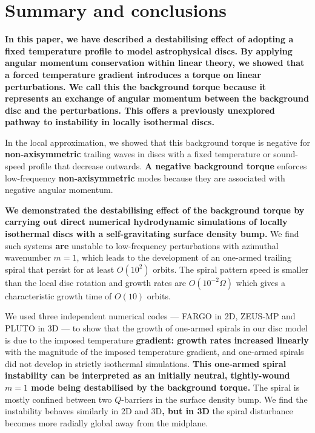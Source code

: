 
\section{Summary and conclusions}\label{summary}
{\bf
  In this paper, we have described a destabilising  
  effect of adopting a fixed temperature profile to model   
  astrophysical discs. By applying angular momentum conservation
  within linear theory, we showed that a forced temperature gradient 
  introduces a torque on linear perturbations. We call this the
  background torque because it represents an exchange of angular
  momentum between the background disc and the perturbations. This 
  offers a previously unexplored pathway to instability in locally
  isothermal discs.  
}

In the local approximation, we showed that this background torque is
negative for {\bf non-axisymmetric} trailing waves in discs with a fixed temperature or
sound-speed profile that decrease outwards. {\bf A negative background torque} enforces  
low-frequency {\bf non-axisymmetric} modes because they are associated
with negative angular momentum.

{\bf 
  We demonstrated the destabilising effect of the background torque by
  carrying out direct numerical hydrodynamic simulations of 
  locally isothermal discs with a self-gravitating surface density
  bump. 
}
We find such systems {\bf are} unstable to low-frequency perturbations
with azimuthal wavenumber $m=1$, which leads to the development of an one-armed 
trailing spiral that persist for at least $O(10^2)$ orbits. The spiral
pattern speed is smaller than the local disc rotation and
growth rates are $O(10^{-2}\Omega)$ which gives a characteristic
growth time of $O(10)$ orbits. 

We used three independent numerical codes --- FARGO in 2D, ZEUS-MP and
PLUTO in 3D --- to show that the growth of     
one-armed spirals in our disc model is due to the imposed
temperature {\bf gradient: growth rates increased linearly}  
with the magnitude of the imposed temperature gradient, and one-armed
spirals did not develop in strictly isothermal simulations. {\bf This 
  one-armed spiral instability can be interpreted as an initially 
  neutral, tightly-wound $m=1$ mode being destabilised by the 
  background torque.} The spiral
is mostly confined between two $Q$-barriers in the surface density bump. 
We find the instability behaves similarly in 2D and 3D{\bf, but in 3D}
the spiral disturbance becomes more radially global away from    
the midplane. 

